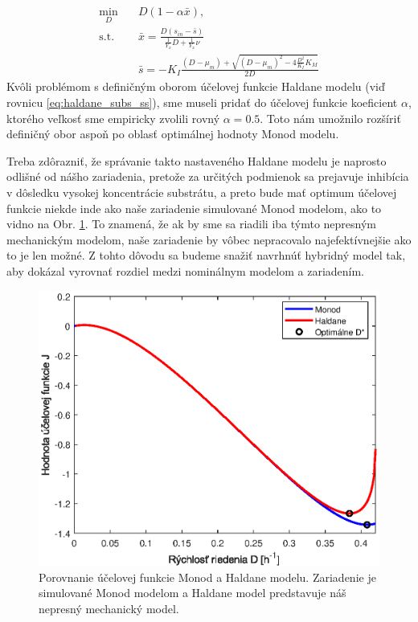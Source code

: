 \begin{equation}
\label{eq:chemostat_opt_w_ss}
	 \begin{split}
		 \min_{D} &\quad D\left(1-\alpha\bar{x}\right), \\
		 \text{s.t.} &\quad \bar{x} = \frac{D\left(s_{in}-\bar{s}\right)}{\frac{1}{Y_{x}}D + \frac{1}{Y_{x}}\nu} \\
		 &\quad \bar{s} = -K_{I}\frac{\left(D-\mu_{m}\right) + \sqrt{\left(D-\mu_{m}\right)^2 - 4\frac{D^2}{K_{I}}K_{M}}}{2D}
	 \end{split}
\end{equation}
Kvôli problémom s definičným oborom účelovej funkcie Haldane modelu (viď rovnicu \eqref{eq:haldane_subs_ss}), sme museli pridať do účelovej funkcie koeficient $ \alpha $, ktorého veľkosť sme empiricky zvolili rovný $ \alpha = 0.5 $. Toto nám umožnilo rozšíriť definičný obor aspoň po oblasť optimálnej hodnoty Monod modelu.

Treba zdôrazniť, že správanie takto nastaveného Haldane modelu je naprosto odlišné od nášho zariadenia, pretože za určitých podmienok sa prejavuje inhibícia v dôsledku vysokej koncentrácie substrátu, a preto bude mať optimum účelovej funkcie niekde inde ako naše zariadenie simulované Monod modelom, ako to vidno na Obr. \ref{fig:cost_fun_comparison}. To znamená, že ak by sme sa riadili iba týmto nepresným mechanickým modelom, naše zariadenie by vôbec nepracovalo najefektívnejšie ako to je len možné. Z tohto dôvodu sa budeme snažiť navrhnúť hybridný model tak, aby dokázal vyrovnať rozdiel medzi nominálnym modelom a zariadením. 
\begin{figure}
	\centering
	\includegraphics[width=0.7\linewidth]{images/cost_fun_comparison}
	\caption{Porovnanie účelovej funkcie Monod a Haldane modelu. Zariadenie je simulované Monod modelom a Haldane model predstavuje náš nepresný mechanický model.}
	\label{fig:cost_fun_comparison}
\end{figure}

